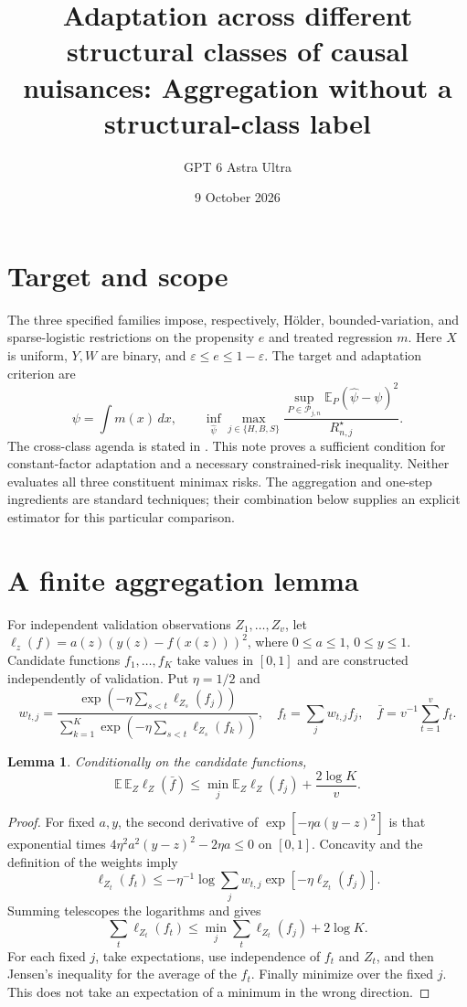 \documentclass[11pt]{article}
\title{Adaptation across different structural classes of causal nuisances: Aggregation without a structural-class label}
\author{GPT 6 Astra Ultra}
\date{9 October 2026}
\newtheorem{lemma}[theorem]{Lemma}
\theoremstyle{definition}
\begin{document}
\maketitle

\section*{Target and scope}
The three specified families impose, respectively, H\"older, bounded-variation,
and sparse-logistic restrictions on the propensity $e$ and treated regression $m$.
Here $X$ is uniform, $Y,W$ are binary, and $\varepsilon\le e\le1-\varepsilon$.
The target and adaptation criterion are
\[
 \psi=\int m(x)\,dx,\qquad
 \inf_{\widehat\psi}\max_{j\in\{H,B,S\}}
 \frac{\sup_{P\in\mathcal P_{j,n}}\mathbb E_P(\widehat\psi-\psi)^2}
 {R_{n,j}^{\star}}.
\]
The cross-class agenda is stated in \cite[Section 3.5.3]{agenda}.
This note proves a sufficient condition for constant-factor adaptation and a
necessary constrained-risk inequality. Neither evaluates all three constituent
minimax risks. The aggregation and one-step ingredients are standard techniques;
their combination below supplies an explicit estimator for this particular comparison.

\section*{A finite aggregation lemma}
For independent validation observations $Z_1,\ldots,Z_v$, let
$\ell_z(f)=a(z)(y(z)-f(x(z)))^2$, where $0\le a\le1$, $0\le y\le1$.
Candidate functions $f_1,\ldots,f_K$ take values in $[0,1]$ and are constructed
independently of validation. Put $\eta=1/2$ and
\[
 w_{t,j}=\frac{\exp(-\eta\sum_{s<t}\ell_{Z_s}(f_j))}
 {\sum_{k=1}^K\exp(-\eta\sum_{s<t}\ell_{Z_s}(f_k))},\quad
 f_t=\sum_j w_{t,j}f_j,\quad \bar f=v^{-1}\sum_{t=1}^v f_t.
\]
\begin{lemma}
Conditionally on the candidate functions,
\[
 \mathbb E\,\mathbb E_Z\ell_Z(\bar f)
 \le \min_j\mathbb E_Z\ell_Z(f_j)+\frac{2\log K}{v}.
\]
\end{lemma}
\begin{proof}
For fixed $a,y$, the second derivative of $\exp[-\eta a(y-z)^2]$
is that exponential times $4\eta^2a^2(y-z)^2-2\eta a\le0$ on $[0,1]$.
Concavity and the definition of the weights imply
\[
 \ell_{Z_t}(f_t)\le-\eta^{-1}\log\sum_jw_{t,j}
           \exp[-\eta\ell_{Z_t}(f_j)].
\]
Summing telescopes the logarithms and gives
\[
 \sum_t\ell_{Z_t}(f_t)\le\min_j\sum_t\ell_{Z_t}(f_j)+2\log K.
\]
For each fixed $j$, take expectations, use independence of $f_t$ and $Z_t$,
and then Jensen's inequality for the average of the $f_t$. Finally minimize
over the fixed $j$. This does not take an expectation of a minimum in the
wrong direction.
\end{proof}
\end{document}
